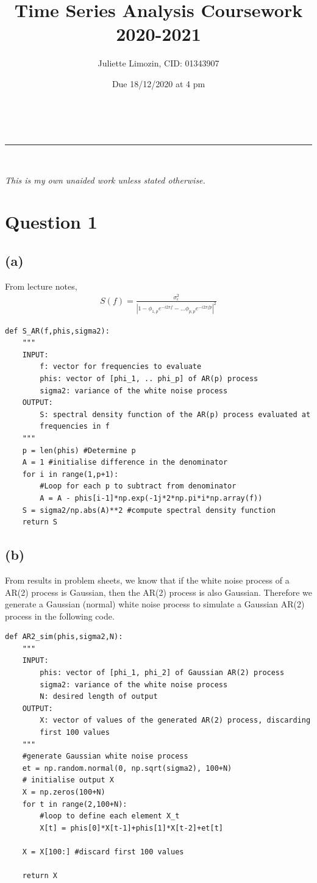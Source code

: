 \documentclass[a4paper,10pt]{article}
\makeatletter
\newcommand{\linia}{\rule{\linewidth}{0.5pt}}
\theoremstyle{mytheor}
\renewcommand{\maketitle}{
\begin{center}
\vspace{2ex}
{\huge \textsc{\@title}}
\vspace{1ex}
\\
\linia\\
\@author \hfill \@date
\vspace{1ex}
\end{center}
}
\makeatother
\begin{document}
\title{Time Series Analysis Coursework 2020-2021}

\author{Juliette Limozin, CID: 01343907}

\date{Due 18/12/2020 at 4 pm}

\maketitle

\textit{This is my own unaided work unless stated otherwise.} 
\section*{Question 1}
\subsection*{(a)}

From lecture notes,
\begin{align*}
    S(f) = \frac{\sigma _\epsilon ^2}{|1-\phi _{1,p}e^{-i2\pi f} - ...\phi _{p,p}e^{-i2\pi fp}|^2}
\end{align*}
\begin{lstlisting}
def S_AR(f,phis,sigma2):
    """
    INPUT:
        f: vector for frequencies to evaluate 
        phis: vector of [phi_1, .. phi_p] of AR(p) process
        sigma2: variance of the white noise process
    OUTPUT:
        S: spectral density function of the AR(p) process evaluated at
        frequencies in f
    """
    p = len(phis) #Determine p
    A = 1 #initialise difference in the denominator
    for i in range(1,p+1):
        #Loop for each p to subtract from denominator
        A = A - phis[i-1]*np.exp(-1j*2*np.pi*i*np.array(f)) 
    S = sigma2/np.abs(A)**2 #compute spectral density function
    return S
\end{lstlisting}

\subsection*{(b)}

From results in problem sheets, we know that if the white noise process of a AR(2) process is Gaussian, then the AR(2) process is also Gaussian. Therefore we generate a Gaussian (normal) white noise process to simulate a Gaussian AR(2) process in the following code.

\begin{lstlisting}
def AR2_sim(phis,sigma2,N):
    """
    INPUT:
        phis: vector of [phi_1, phi_2] of Gaussian AR(2) process
        sigma2: variance of the white noise process
        N: desired length of output
    OUTPUT:
        X: vector of values of the generated AR(2) process, discarding 
        first 100 values
    """
    #generate Gaussian white noise process
    et = np.random.normal(0, np.sqrt(sigma2), 100+N) 
    # initialise output X
    X = np.zeros(100+N)
    for t in range(2,100+N):
        #loop to define each element X_t
        X[t] = phis[0]*X[t-1]+phis[1]*X[t-2]+et[t]
    
    X = X[100:] #discard first 100 values
    
    return X
\end{lstlisting}
\end{document}
